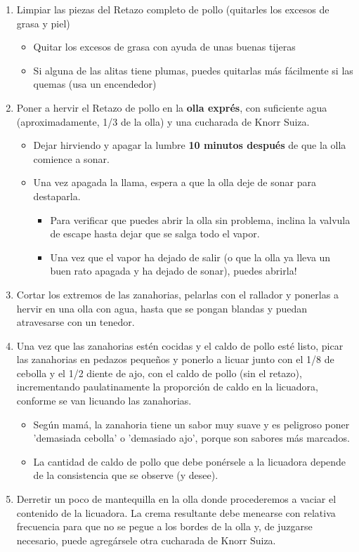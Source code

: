 \documentclass[letterpaper]{article}
\begin{document}
\begin{enumerate}
\item Limpiar las piezas del Retazo completo de pollo (quitarles los excesos de grasa y piel)
	\begin{itemize}
	\item Quitar los excesos de grasa con ayuda de unas buenas tijeras
	\item Si alguna de las alitas tiene plumas, puedes quitarlas más fácilmente si las quemas (usa un encendedor)
	\end{itemize}
\item Poner a hervir el Retazo de pollo en la \textbf{olla exprés}, con suficiente agua (aproximadamente, 1/3 de la olla) y una cucharada de Knorr Suiza.
	\begin{itemize}
	\item Dejar hirviendo y apagar la lumbre \textbf{10 minutos después} de que la olla comience a sonar.
	\item Una vez apagada la llama, espera a que la olla deje de sonar para destaparla.
		\begin{itemize}
		\item Para verificar que puedes abrir la olla sin problema, inclina la valvula de escape hasta dejar que se salga todo el vapor.
		\item Una vez que el vapor ha dejado de salir (o que la olla ya lleva un buen rato apagada y ha dejado de sonar), puedes abrirla!
		\end{itemize}
	\end{itemize}
\item Cortar los extremos de las zanahorias, pelarlas con el rallador y ponerlas a hervir en una olla con agua, hasta que se pongan blandas y puedan atravesarse con un tenedor.
\item Una vez que las zanahorias estén cocidas y el caldo de pollo esté listo, picar las zanahorias en pedazos pequeños y ponerlo a licuar junto con el 1/8 de cebolla y el 1/2 diente de ajo, con el caldo de pollo (sin el retazo), incrementando paulatinamente la proporción de caldo en la licuadora, conforme se van licuando las zanahorias.
	\begin{itemize}
		\item Según mamá, la zanahoria tiene un sabor muy suave y es peligroso poner 'demasiada cebolla' o 'demasiado ajo', porque son sabores más marcados.
		\item La cantidad de caldo de pollo que debe ponérsele a la licuadora depende de la consistencia que se observe (y desee).
	\end{itemize}
\item Derretir un poco de mantequilla en la olla donde procederemos a vaciar el contenido de la licuadora. La crema resultante debe menearse con relativa frecuencia para que no se pegue a los bordes de la olla y, de juzgarse necesario, puede agregársele otra cucharada de Knorr Suiza.
\end{enumerate}
\end{document}
